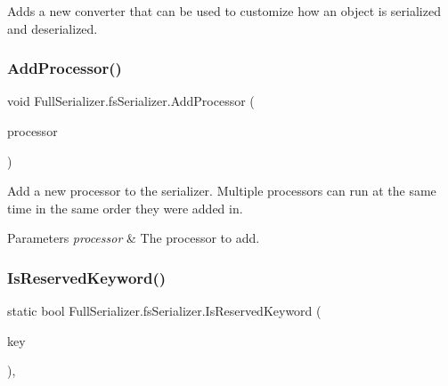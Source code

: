 Adds a new converter that can be used to customize how an object is serialized and deserialized. 

\mbox{\label{class_full_serializer_1_1fs_serializer_a30ed281d93548dcb4deea1815096f87b}} 
\subsubsection{\texorpdfstring{Add\+Processor()}{AddProcessor()}}
{\footnotesize\ttfamily void Full\+Serializer.\+fs\+Serializer.\+Add\+Processor (\begin{DoxyParamCaption}\item[{\hyperlink{class_full_serializer_1_1fs_object_processor}{fs\+Object\+Processor}}]{processor }\end{DoxyParamCaption})\hspace{0.3cm}{\ttfamily [inline]}}



Add a new processor to the serializer. Multiple processors can run at the same time in the same order they were added in. 


\begin{DoxyParams}{Parameters}
{\em processor} & The processor to add.\\
\hline
\end{DoxyParams}
\mbox{\label{class_full_serializer_1_1fs_serializer_a720cc782d2299ee7a1050905d224a12c}} 
\subsubsection{\texorpdfstring{Is\+Reserved\+Keyword()}{IsReservedKeyword()}}
{\footnotesize\ttfamily static bool Full\+Serializer.\+fs\+Serializer.\+Is\+Reserved\+Keyword (\begin{DoxyParamCaption}\item[{string}]{key }\end{DoxyParamCaption})\hspace{0.3cm}{\ttfamily [inline]}, {\ttfamily [static]}}



